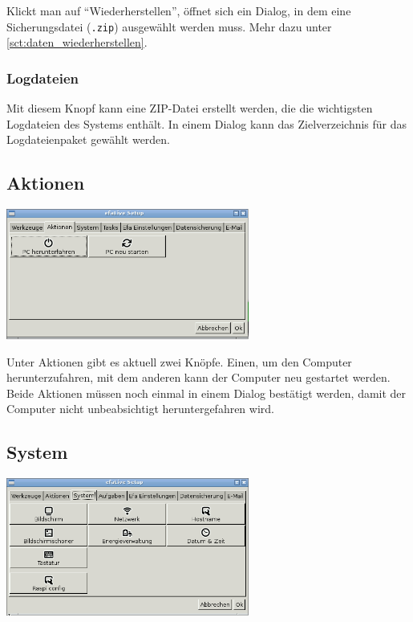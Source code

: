 \documentclass[a4paper,12pt,twoside]{article}
\begin{document}
Klickt man auf "`Wiederherstellen"', öffnet
sich ein Dialog, in dem eine Sicherungsdatei (\texttt{.zip})
ausgewählt werden muss. Mehr dazu unter \ref{sct:daten_wiederherstellen}.


\subsubsection{Logdateien}
\label{sct:logfiles}
Mit diesem Knopf kann eine ZIP-Datei erstellt werden, die die wichtigsten
Logdateien des Systems enthält. In einem Dialog kann das Zielverzeichnis 
für das Logdateienpaket gewählt werden.


\subsection{Aktionen}
\label{sct:aktionen}

\begin{minipage}{\linewidth}
    \centering
    \captionsetup{type=figure}
    \includegraphics[width=8cm]{screenshots/efalive_setup_actions.png}
    \label{fig:efalivesetup_actions}
\end{minipage}
\bigskip

Unter Aktionen gibt es aktuell zwei Knöpfe. Einen, um den Computer
herunterzufahren, mit dem anderen kann der Computer neu gestartet
werden. Beide Aktionen müssen noch einmal in einem Dialog bestätigt
werden, damit der Computer nicht unbeabsichtigt heruntergefahren wird.


\subsection{System}
\label{sct:efalivesetup_system}

\begin{minipage}{\linewidth}
    \centering
    \captionsetup{type=figure}
    \includegraphics[width=8cm]{screenshots/efalive_setup_system.png}
    \label{fig:efalivesetup_system}
\end{minipage}
\bigskip
\end{document}
